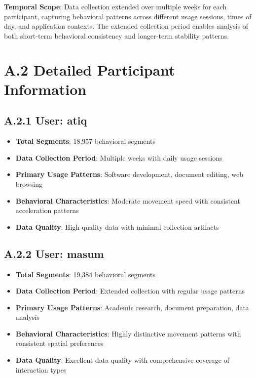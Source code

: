 \documentclass[
  12pt,
  a4paper,
]{report}
\providecommand{\tightlist}{%
  \setlength{\itemsep}{0pt}\setlength{\parskip}{0pt}}
\begin{document}
\textbf{Temporal Scope}: Data collection extended over multiple weeks
for each participant, capturing behavioral patterns across different
usage sessions, times of day, and application contexts. The extended
collection period enables analysis of both short-term behavioral
consistency and longer-term stability patterns.

\section{A.2 Detailed Participant
Information}\label{a.2-detailed-participant-information}

\subsection{A.2.1 User: atiq}\label{a.2.1-user-atiq}

\begin{itemize}
\tightlist
\item
  \textbf{Total Segments}: 18,957 behavioral segments
\item
  \textbf{Data Collection Period}: Multiple weeks with daily usage
  sessions
\item
  \textbf{Primary Usage Patterns}: Software development, document
  editing, web browsing
\item
  \textbf{Behavioral Characteristics}: Moderate movement speed with
  consistent acceleration patterns
\item
  \textbf{Data Quality}: High-quality data with minimal collection
  artifacts
\end{itemize}

\subsection{A.2.2 User: masum}\label{a.2.2-user-masum}

\begin{itemize}
\tightlist
\item
  \textbf{Total Segments}: 19,384 behavioral segments
\item
  \textbf{Data Collection Period}: Extended collection with regular
  usage patterns
\item
  \textbf{Primary Usage Patterns}: Academic research, document
  preparation, data analysis
\item
  \textbf{Behavioral Characteristics}: Highly distinctive movement
  patterns with consistent spatial preferences
\item
  \textbf{Data Quality}: Excellent data quality with comprehensive
  coverage of interaction types
\end{itemize}
\end{document}
